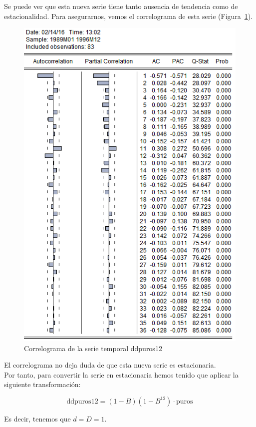 \documentclass[12pt,a4paper,twoside,openright,titlepage,final]{article}
\begin{document}
Se puede ver que esta nueva serie tiene tanto ausencia de tendencia como de estacionalidad. Para asegurarnos, vemos el correlograma de esta serie (Figura~\ref{fig:correlograma-puros-diferenciada-estacional12}).\\

\begin{figure}[tbph!]
	\centering
	\includegraphics[width=0.8\linewidth]{imagenes/puros/correlograma-puros-diferenciada-estacional12.png}
	\caption{Correlograma de la serie temporal ddpuros12}
	\label{fig:correlograma-puros-diferenciada-estacional12}
\end{figure}

El correlograma no deja duda de que esta nueva serie es estacionaria.\\

Por tanto, para convertir la serie en estacionaria hemos tenido que aplicar la siguiente transformación:

\[ \text{ddpuros12} = (1-B)(1-B^{12}) \cdot \text{puros} \]

Es decir, tenemos que $d=D=1$.\\
\end{document}
